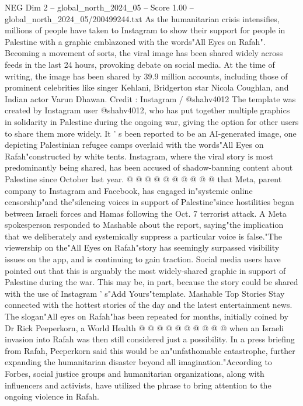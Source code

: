 \begin{textsample}{NEG Dim 2 – global\_north\_2024\_05 – Score 1.00 – global\_north\_2024\_05/200499244.txt}  \label{ex:f2_neg_057}
As the humanitarian crisis intensifies, millions of people have taken to Instagram to show their support for people in Palestine with a graphic emblazoned with the words"All Eyes on Rafah".
Becoming a movement of sorts, the viral image has been shared widely across feeds in the last 24 hours, provoking debate on social media.
At the time of writing, the image has been shared by 39.9 million accounts, including those of prominent celebrities like singer Kehlani, Bridgerton star Nicola Coughlan, and Indian actor Varun Dhawan.
Credit : Instagram / @shahv4012 The template was created by Instagram user @shahv4012, who has put together multiple graphics in solidarity in Palestine during the ongoing war, giving the option for other users to share them more widely.
It ' s been reported to be an AI-generated image, one depicting Palestinian refugee camps overlaid with the words"All Eyes on Rafah"constructed by white tents.
Instagram, where the viral story is most predominantly being shared, has been accused of shadow-banning content about Palestine since October last year. @ @ @ @ @ @ @ @ @ @ that Meta, parent company to Instagram and Facebook, has engaged in"systemic online censorship"and the"silencing voices in support of Palestine"since hostilities began between Israeli forces and Hamas following the Oct. 7 terrorist attack.
A Meta spokesperson responded to Mashable about the report, saying"the implication that we deliberately and systemically suppress a particular voice is false."The viewership on the"All Eyes on Rafah"story has seemingly surpassed visibility issues on the app, and is continuing to gain traction.
Social media users have pointed out that this is arguably the most widely-shared graphic in support of Palestine during the war.
This may be, in part, because the story could be shared with the use of Instagram ' s"Add Yours"template.
Mashable Top Stories Stay connected with the hottest stories of the day and the latest entertainment news.
The slogan"All eyes on Rafah"has been repeated for months, initially coined by Dr Rick Peeperkorn, a World Health @ @ @ @ @ @ @ @ @ @ when an Israeli invasion into Rafah was then still considered just a possibility.
In a press briefing from Rafah, Peeperkorn said this would be an"unfathomable catastrophe, further expanding the humanitarian disaster beyond all imagination."According to Forbes, social justice groups and humanitarian organizations, along with influencers and activists, have utilized the phrase to bring attention to the ongoing violence in Rafah.

\end{textsample}
